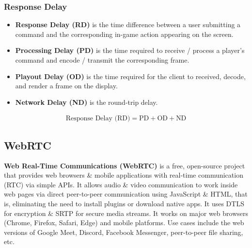 \documentclass[a4paper,11pt]{article}
\begin{document}
\subsubsection{Response Delay}
\begin{itemize}
    \item   \textbf{Response Delay (RD)} is the time difference between a user submitting a command and the corresponding in-game action appearing on the screen.
    \item   \textbf{Processing Delay (PD)} is the time required to receive / process a player's command and encode / transmit the corresponding frame.

    \item   \textbf{Playout Delay (OD)} is the time required for the client to received, decode, and render a frame on the display.

    \item   \textbf{Network Delay (ND)} is the round-trip delay.
\end{itemize}

\begin{align*}
    \text{Response Delay (RD)} = \text{PD} + \text{OD} + \text{ND}
\end{align*}

\subsection{WebRTC}
\textbf{Web Real-Time Communications (WebRTC)} is a free, open-source project that provides web browsers \& mobile applications with real-time communication (RTC) via simple APIs.
It allows audio \& video communication to work inside web pages via direct peer-to-peer communication using JavaScript \& HTML, that is, eliminating the need to install plugins or download native apps.
It uses DTLS for encryption \& SRTP for secure media streams.
It works on major web browsers (Chrome, Firefox, Safari, Edge) and mobile platforms.
Use cases include the web versions of Google Meet, Discord, Facebook Messenger, peer-to-peer file sharing, etc.
\end{document}
